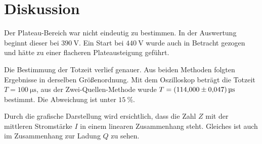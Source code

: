\section{Diskussion}
\label{sec:Diskussion}
Der Plateau-Bereich war nicht eindeutig zu bestimmen.
In der Auswertung beginnt dieser bei $\SI{390}{\volt}$.
Ein Start bei $\SI{440}{\volt}$ wurde auch in Betracht gezogen und hätte zu einer flacheren Plateausteigung geführt.

Die Bestimmung der Totzeit verlief genauer.
Aus beiden Methoden folgten Ergebnisse in derselben Größenordnung.
Mit dem Oszilloskop beträgt die Totzeit $T= \SI{100}{\micro\second}$, aus der Zwei-Quellen-Methode wurde $T= \SI{114 \pm 0.047}{\micro\second}$ bestimmt.
Die Abweichung ist unter $\SI{15}{\percent}$.

Durch die grafische Darstellung wird ersichtlich, dass die Zahl $Z$ mit der mittleren Stromstärke $I$ in einem linearen Zusammenhang steht.
Gleiches ist auch im Zusammenhang zur Ladung $Q$ zu sehen.